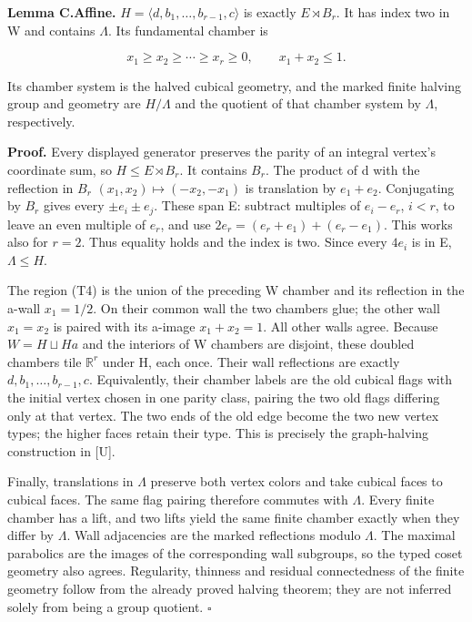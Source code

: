 \textbf{Lemma C.Affine.} \(H=\langle d,b_1,\ldots ,b_{r-1},c\rangle\) is
exactly \(E\rtimes B_r\). It has index two in W and contains
\(\Lambda\). Its fundamental chamber is

\[
x_1\ge x_2\ge\cdots\ge x_r\ge0,\qquad x_1+x_2\le1.
\tag{T4}
\]

Its chamber system is the halved cubical geometry, and the marked finite
halving group and geometry are \(H/\Lambda\) and the quotient of that
chamber system by \(\Lambda\), respectively.

\textbf{Proof.} Every displayed generator preserves the parity of an
integral vertex's coordinate sum, so \(H\le E\rtimes B_r\). It contains
\(B_r\). The product of d with the reflection in \(B_r\)
\((x_1,x_2)\mapsto (-x_2,-x_1)\) is translation by \(e_1+e_2\).
Conjugating by \(B_r\) gives every \(±e_i±e_j\). These span E: subtract
multiples of \(e_i-e_r\), \(i<r\), to leave an even multiple of
\(e_r\), and use \(2e_r=(e_r+e_1)+(e_r-e_1)\). This works also for
\(r=2\). Thus equality holds and the index is two. Since every \(4e_i\)
is in E, \(\Lambda \le H\).

The region (T4) is the union of the preceding W chamber and its
reflection in the a-wall \(x_1=1/2\). On their common wall the two
chambers glue; the other wall \(x_1=x_2\) is paired with its a-image
\(x_1+x_2=1\). All other walls agree. Because \(W=H\sqcup Ha\) and the
interiors of W chambers are disjoint, these doubled chambers tile
\(\mathbb R^r\) under H, each once. Their wall reflections are exactly
\(d,b_1,\ldots ,b_{r-1},c\). Equivalently, their chamber labels are the
old cubical flags with the initial vertex chosen in one parity class,
pairing the two old flags differing only at that vertex. The two ends of
the old edge become the two new vertex types; the higher faces retain
their type. This is precisely the graph-halving construction in [U].

Finally, translations in \(\Lambda\) preserve both vertex colors and
take cubical faces to cubical faces. The same flag pairing therefore
commutes with \(\Lambda\). Every finite chamber has a lift, and two
lifts yield the same finite chamber exactly when they differ by
\(\Lambda\). Wall adjacencies are the marked reflections modulo
\(\Lambda\). The maximal parabolics are the images of the corresponding
wall subgroups, so the typed coset geometry also agrees. Regularity,
thinness and residual connectedness of the finite geometry follow from
the already proved halving theorem; they are not inferred solely from
being a group quotient. \(\square\)

